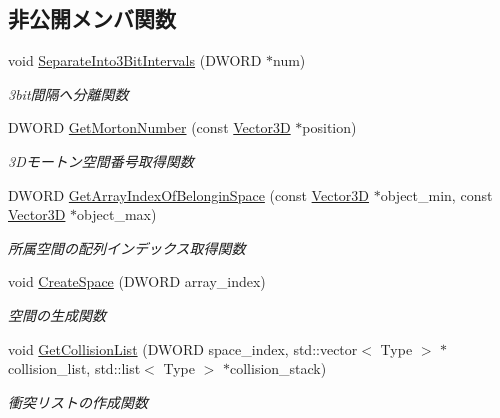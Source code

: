 \subsection*{非公開メンバ関数}
\begin{DoxyCompactItemize}
\item 
void \mbox{\hyperlink{class_liner_octree_acfa567ec0f969684f55443fc9ee98432}{Separate\+Into3\+Bit\+Intervals}} (D\+W\+O\+RD $\ast$num)
\begin{DoxyCompactList}\small\item\em 3bit間隔へ分離関数 \end{DoxyCompactList}\item 
D\+W\+O\+RD \mbox{\hyperlink{class_liner_octree_a310bf4eaded9ff5a1c5ce4262e74662b}{Get\+Morton\+Number}} (const \mbox{\hyperlink{class_vector3_d}{Vector3D}} $\ast$position)
\begin{DoxyCompactList}\small\item\em 3\+Dモートン空間番号取得関数 \end{DoxyCompactList}\item 
D\+W\+O\+RD \mbox{\hyperlink{class_liner_octree_adf06484a50549a17b1657f188814709e}{Get\+Array\+Index\+Of\+Belongin\+Space}} (const \mbox{\hyperlink{class_vector3_d}{Vector3D}} $\ast$object\+\_\+min, const \mbox{\hyperlink{class_vector3_d}{Vector3D}} $\ast$object\+\_\+max)
\begin{DoxyCompactList}\small\item\em 所属空間の配列インデックス取得関数 \end{DoxyCompactList}\item 
void \mbox{\hyperlink{class_liner_octree_a62aa42a787a399c3651bac3bbef8f1a6}{Create\+Space}} (D\+W\+O\+RD array\+\_\+index)
\begin{DoxyCompactList}\small\item\em 空間の生成関数 \end{DoxyCompactList}\item 
void \mbox{\hyperlink{class_liner_octree_aa166d590cbda54d856a732d0171f6554}{Get\+Collision\+List}} (D\+W\+O\+RD space\+\_\+index, std\+::vector$<$ Type $>$ $\ast$collision\+\_\+list, std\+::list$<$ Type $>$ $\ast$collision\+\_\+stack)
\begin{DoxyCompactList}\small\item\em 衝突リストの作成関数 \end{DoxyCompactList}\end{DoxyCompactItemize}
